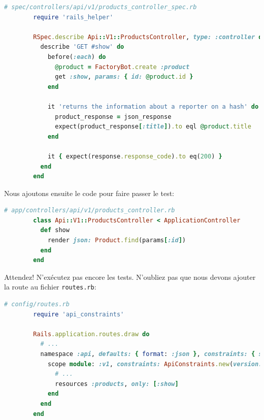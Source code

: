 \documentclass[]{report}
\begin{document}
      \begin{scriptsize}
        \begin{lstlisting}[language=ruby, caption={Test d'affichage d'un produit}, label={lst:products_controller_spec_show}]
        # spec/controllers/api/v1/products_controller_spec.rb
        require 'rails_helper'

        RSpec.describe Api::V1::ProductsController, type: :controller do
          describe 'GET #show' do
            before(:each) do
              @product = FactoryBot.create :product
              get :show, params: { id: @product.id }
            end

            it 'returns the information about a reporter on a hash' do
              product_response = json_response
              expect(product_response[:title]).to eql @product.title
            end

            it { expect(response.response_code).to eq(200) }
          end
        end
        \end{lstlisting}
      \end{scriptsize}

      Nous ajoutons ensuite le code pour faire passer le test:

      \begin{scriptsize}
        \begin{lstlisting}[language=ruby]
        # app/controllers/api/v1/products_controller.rb
        class Api::V1::ProductsController < ApplicationController
          def show
            render json: Product.find(params[:id])
          end
        end
        \end{lstlisting}
      \end{scriptsize}

      Attendez! N'exécutez pas encore les tests. N'oubliez pas que nous devons ajouter la route au fichier \verb|routes.rb|:

      \begin{scriptsize}
        \begin{lstlisting}[language=ruby]
        # config/routes.rb
        require 'api_constraints'

        Rails.application.routes.draw do
          # ...
          namespace :api, defaults: { format: :json }, constraints: { subdomain: 'api' }, path: '/' do
            scope module: :v1, constraints: ApiConstraints.new(version: 1, default: true) do
              # ...
              resources :products, only: [:show]
            end
          end
        end
        \end{lstlisting}
      \end{scriptsize}
\end{document}

